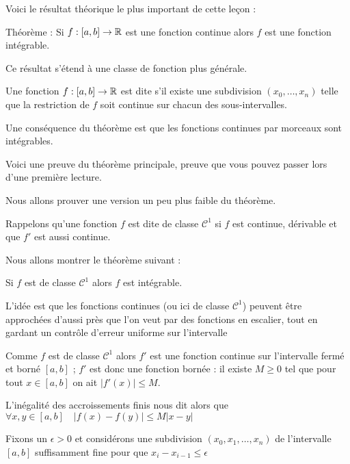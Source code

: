 Voici le résultat théorique le plus important de cette leçon :

Théorème : Si $f : [a,b] \to \mathbb{R}$ est une fonction continue alors $f$ est une fonction intégrable.  


\change

Ce résultat s'étend à une classe de fonction plus générale.

Une fonction $f : [a,b] \to \mathbb{R}$ est dite  s'il existe 
une subdivision $(x_0,\ldots,x_n)$ telle que la restriction de $f$ soit continue sur chacun des sous-intervalles.

\change

Une conséquence du théorème est que les fonctions continues par morceaux sont intégrables.

\diapo

Voici une preuve du théorème principale, preuve que vous pouvez passer lors d'une première lecture.

Nous allons prouver une version un peu plus faible du théorème.  

Rappelons qu'une fonction $f$ est dite de 
classe $\mathcal{C}^1$ si $f$ est continue, dérivable et que $f'$ est aussi continue.

\change

Nous allons montrer le théorème suivant :

Si $f$ est de classe $\mathcal{C}^1$ alors $f$ est intégrable. 


L'idée est que les fonctions continues (ou ici de classe $\mathcal{C}^1$) 
peuvent être approchées d'aussi près que l'on veut par des fonctions en escalier, 
tout en gardant un contrôle d'erreur uniforme sur l'intervalle

\change

Comme $f$ est de classe  $\mathcal{C}^1$ alors $f'$ est une fonction continue sur l'intervalle fermé et borné $[a,b]$ ;
$f'$ est donc une fonction bornée : il existe $M\ge 0$ tel que pour tout $x \in [a,b]$ on ait $|f'(x)|\le M$.


\change

L'inégalité des accroissements finis nous dit alors que 
$\forall x,y \in [a,b] \quad |f(x)-f(y)| \le M |x-y|$


\change

Fixons un $\epsilon>0$ et considérons une subdivision $(x_0,x_1,\ldots,x_n)$ de l'intervalle 
$[a,b]$ suffisamment fine pour que $x_i-x_{i-1} \le \epsilon$


